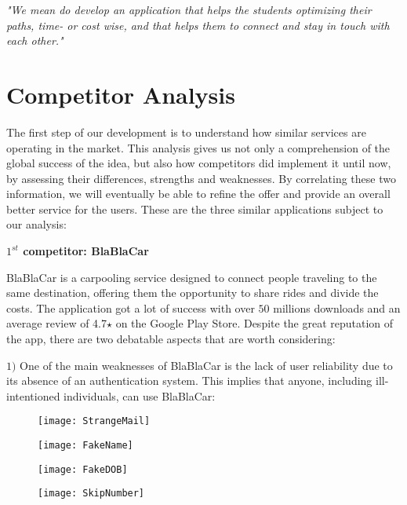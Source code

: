 \documentclass{article}
\begin{document}
\textit{"We mean do develop an application that helps the students optimizing their paths, time- or cost wise, and that helps them to connect and stay in touch with each other."} \newline 

\section{Competitor Analysis}
The first step of our development is to understand how similar services are operating in the market. This analysis gives us not only a comprehension of the global success of the idea, but also how competitors did implement it until now, by assessing their differences, strengths and weaknesses. By correlating these two information, we will eventually be able to refine the offer and provide an overall better service for the users. These are the three similar applications subject to our analysis: \newline 

\textbf{$1^{st}$ competitor: BlaBlaCar}
\graphicspath{{Doc images/Competitor Analysis/BlaBlaCar}}

BlaBlaCar is a carpooling service designed to connect people traveling to the same destination, offering them the opportunity to share rides and divide the costs. The application got a lot of success with over $50$ millions downloads and an average review of 4.7$\star$ on the Google Play Store. Despite the great reputation of the app, there are two debatable aspects that are worth considering: \newline 

\textbf{$1)$} One of the main weaknesses of BlaBlaCar is the lack of user reliability due to its absence of an authentication system. This implies that anyone, including ill-intentioned individuals, can use BlaBlaCar: 

\begin{figure}[htbp]
  \centering
  \begin{minipage}[t]{0.24\textwidth}
    \texttt{[image: StrangeMail]}
  \end{minipage}
  \hfill
  \begin{minipage}[t]{0.24\textwidth}
    \texttt{[image: FakeName]}
  \end{minipage}
  \hfill
  \begin{minipage}[t]{0.24\textwidth}
    \texttt{[image: FakeDOB]}
  \end{minipage}
  \hfill
  \begin{minipage}[t]{0.24\textwidth}
    \texttt{[image: SkipNumber]}
  \end{minipage}
\end{figure}
\end{document}
